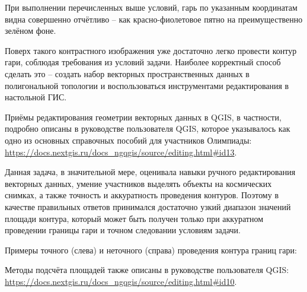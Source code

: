 При выполнении перечисленных выше условий, гарь по указанным координатам видна совершенно отчётливо – как красно-фиолетовое пятно на преимущественно зелёном фоне.


Поверх такого контрастного изображения уже достаточно легко провести контур гари, соблюдая требования из условий задачи. Наиболее корректный способ сделать это – создать набор векторных пространственных данных в полигональной топологии и воспользоваться инструментами редактирования в настольной ГИС.

Приёмы редактирования геометрии векторных данных в QGIS, в частности, подробно описаны в руководстве пользователя QGIS, которое указывалось как одно из основных справочных пособий для участников Олимпиады: \url{https://docs.nextgis.ru/docs_ngqgis/source/editing.html#id13}.

Данная задача, в значительной мере, оценивала навыки ручного редактирования векторных данных, умение участников выделять объекты на космических снимках, а также точность и аккуратность проведения контуров. Поэтому в качестве правильных ответов принимался достаточно узкий диапазон значений площади контура, который может быть получен только при аккуратном проведении границы гари и точном следовании условиям задачи.

Примеры точного (слева) и неточного (справа) проведения контура границ гари:


Методы подсчёта площадей также описаны в руководстве пользователя QGIS: \url{https://docs.nextgis.ru/docs_ngqgis/source/editing.html#id10}.

